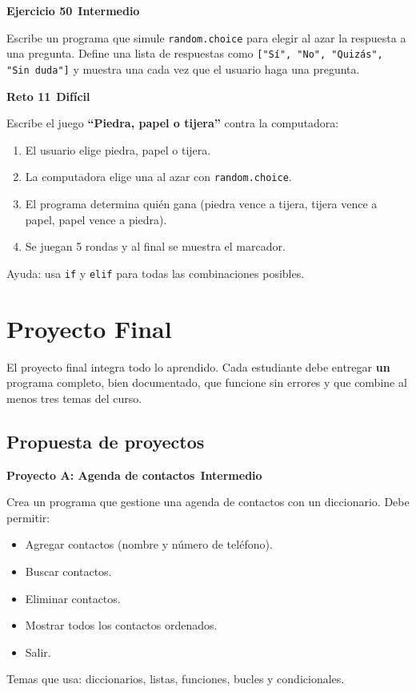 \documentclass[11pt,a4paper]{article}
\newcommand{\intermedio}{\textcolor{naranjaVivo}{\faIcon{circle}\,\textbf{Intermedio}}}
\newcommand{\dificil}{\textcolor{rojoAlerta}{\faIcon{circle}\,\textbf{Difícil}}}
\begin{document}
\begin{cajaEjercicio}
\textbf{Ejercicio 50} \intermedio

Escribe un programa que simule \texttt{random.choice} para elegir al azar la respuesta a una pregunta. Define una lista de respuestas como \texttt{["Sí", "No", "Quizás", "Sin duda"]} y muestra una cada vez que el usuario haga una pregunta.
\end{cajaEjercicio}

\begin{cajaReto}
\textbf{Reto 11} \dificil

Escribe el juego \textbf{``Piedra, papel o tijera''} contra la computadora:
\begin{enumerate}
    \item El usuario elige piedra, papel o tijera.
    \item La computadora elige una al azar con \texttt{random.choice}.
    \item El programa determina quién gana (piedra vence a tijera, tijera vence a papel, papel vence a piedra).
    \item Se juegan 5 rondas y al final se muestra el marcador.
\end{enumerate}
Ayuda: usa \texttt{if} y \texttt{elif} para todas las combinaciones posibles.
\end{cajaReto}

\section{Proyecto Final}

El proyecto final integra todo lo aprendido. Cada estudiante debe entregar \textbf{un} programa completo, bien documentado, que funcione sin errores y que combine al menos tres temas del curso.

\subsection{Propuesta de proyectos}

\begin{cajaEjercicio}
\textbf{Proyecto A: Agenda de contactos} \intermedio

Crea un programa que gestione una agenda de contactos con un diccionario. Debe permitir:
\begin{itemize}
    \item Agregar contactos (nombre y número de teléfono).
    \item Buscar contactos.
    \item Eliminar contactos.
    \item Mostrar todos los contactos ordenados.
    \item Salir.
\end{itemize}
Temas que usa: diccionarios, listas, funciones, bucles y condicionales.
\end{cajaEjercicio}
\end{document}
